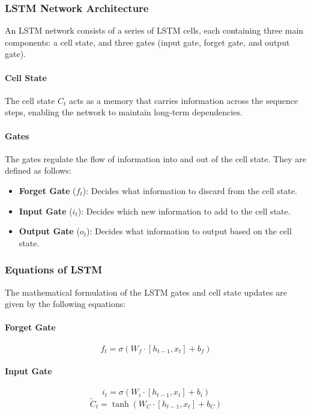 \subsubsection{LSTM Network Architecture}
An LSTM network consists of a series of LSTM cells, each containing three main components: a cell state, and three gates (input gate, forget gate, and output gate).

\paragraph{Cell State}
The cell state \(C_t\) acts as a memory that carries information across the sequence steps, enabling the network to maintain long-term dependencies.

\paragraph{Gates}
The gates regulate the flow of information into and out of the cell state. They are defined as follows:

\begin{itemize}
    \item \textbf{Forget Gate} (\(f_t\)): Decides what information to discard from the cell state.
    \item \textbf{Input Gate} (\(i_t\)): Decides which new information to add to the cell state.
    \item \textbf{Output Gate} (\(o_t\)): Decides what information to output based on the cell state.
\end{itemize}

\subsubsection{Equations of LSTM}
The mathematical formulation of the LSTM gates and cell state updates are given by the following equations:

\paragraph{Forget Gate}
\[
f_t = \sigma(W_f \cdot [h_{t-1}, x_t] + b_f)
\]

\paragraph{Input Gate}
\[
i_t = \sigma(W_i \cdot [h_{t-1}, x_t] + b_i)
\]
\[
\tilde{C}_t = \tanh(W_C \cdot [h_{t-1}, x_t] + b_C)
\]

